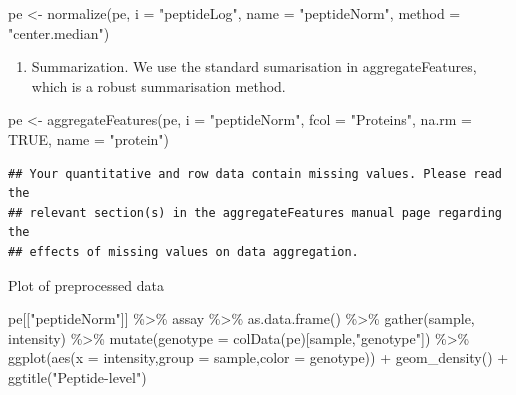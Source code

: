 \documentclass[
]{article}
\newenvironment{Shaded}{\begin{snugshade}}{\end{snugshade}}
\newcommand{\AttributeTok}[1]{\textcolor[rgb]{0.77,0.63,0.00}{#1}}
\newcommand{\ConstantTok}[1]{\textcolor[rgb]{0.00,0.00,0.00}{#1}}
\newcommand{\FunctionTok}[1]{\textcolor[rgb]{0.00,0.00,0.00}{#1}}
\newcommand{\NormalTok}[1]{#1}
\newcommand{\OtherTok}[1]{\textcolor[rgb]{0.56,0.35,0.01}{#1}}
\newcommand{\SpecialCharTok}[1]{\textcolor[rgb]{0.00,0.00,0.00}{#1}}
\newcommand{\StringTok}[1]{\textcolor[rgb]{0.31,0.60,0.02}{#1}}
\providecommand{\tightlist}{%
  \setlength{\itemsep}{0pt}\setlength{\parskip}{0pt}}
\begin{document}
\begin{Shaded}
\begin{Highlighting}[]
\NormalTok{pe }\OtherTok{\textless{}{-}} \FunctionTok{normalize}\NormalTok{(pe, }
                \AttributeTok{i =} \StringTok{"peptideLog"}\NormalTok{, }
                \AttributeTok{name =} \StringTok{"peptideNorm"}\NormalTok{, }
                \AttributeTok{method =} \StringTok{"center.median"}\NormalTok{)}
\end{Highlighting}
\end{Shaded}

\begin{enumerate}
\def\labelenumi{\arabic{enumi}.}
\setcounter{enumi}{3}
\tightlist
\item
  Summarization. We use the standard sumarisation in aggregateFeatures,
  which is a robust summarisation method.
\end{enumerate}

\begin{Shaded}
\begin{Highlighting}[]
\NormalTok{pe }\OtherTok{\textless{}{-}} \FunctionTok{aggregateFeatures}\NormalTok{(pe,}
    \AttributeTok{i =} \StringTok{"peptideNorm"}\NormalTok{, }
    \AttributeTok{fcol =} \StringTok{"Proteins"}\NormalTok{, }
    \AttributeTok{na.rm =} \ConstantTok{TRUE}\NormalTok{,}
    \AttributeTok{name =} \StringTok{"protein"}\NormalTok{)}
\end{Highlighting}
\end{Shaded}

\begin{verbatim}
## Your quantitative and row data contain missing values. Please read the
## relevant section(s) in the aggregateFeatures manual page regarding the
## effects of missing values on data aggregation.
\end{verbatim}

Plot of preprocessed data

\begin{Shaded}
\begin{Highlighting}[]
\NormalTok{pe[[}\StringTok{"peptideNorm"}\NormalTok{]] }\SpecialCharTok{\%\textgreater{}\%} 
\NormalTok{  assay }\SpecialCharTok{\%\textgreater{}\%}
  \FunctionTok{as.data.frame}\NormalTok{() }\SpecialCharTok{\%\textgreater{}\%}
  \FunctionTok{gather}\NormalTok{(sample, intensity) }\SpecialCharTok{\%\textgreater{}\%} 
  \FunctionTok{mutate}\NormalTok{(}\AttributeTok{genotype =} \FunctionTok{colData}\NormalTok{(pe)[sample,}\StringTok{"genotype"}\NormalTok{]) }\SpecialCharTok{\%\textgreater{}\%}
  \FunctionTok{ggplot}\NormalTok{(}\FunctionTok{aes}\NormalTok{(}\AttributeTok{x =}\NormalTok{ intensity,}\AttributeTok{group =}\NormalTok{ sample,}\AttributeTok{color =}\NormalTok{ genotype)) }\SpecialCharTok{+} 
    \FunctionTok{geom\_density}\NormalTok{() }\SpecialCharTok{+}
    \FunctionTok{ggtitle}\NormalTok{(}\StringTok{"Peptide{-}level"}\NormalTok{)}
\end{Highlighting}
\end{Shaded}
\end{document}
